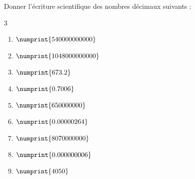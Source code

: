 \documentclass[main.tex]{subfiles}
\begin{document}
\begin{exercise} 
	Donner l'écriture scientifique des nombres décimaux suivants :
	\begin{multicols}{3}
		\begin{enumerate}[label={\alph*)},leftmargin=*]
			\item $\numprint{540000000000} $ 
			\item $\numprint{1048000000000} $
			\item $\numprint{673.2} $
			\item $\numprint{0.7006} $
			\item $\numprint{650000000} $
			\item $\numprint{0.00000264} $
			\item $\numprint{8070000000} $
			\item $\numprint{0.000000006} $
			\item $\numprint{4050} $ 
		\end{enumerate}
	\end{multicols} 
\end{exercise}
\end{document}
